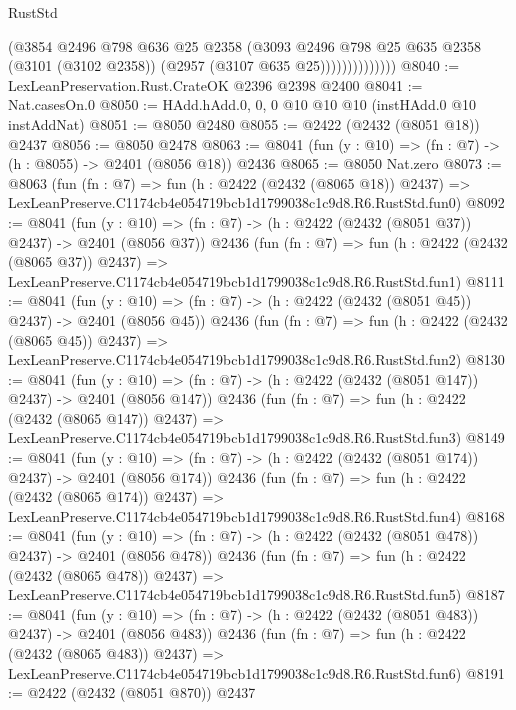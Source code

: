 \begin{lexlean}{RustStd}
\begin{coremodule}
                        (@3854
                          @2496
                          @798
                          @636
                          @25
                          @2358
                          (@3093
                            @2496
                            @798
                            @25
                            @635
                            @2358
                            (@3101 (@3102 @2358))
                            (@2957 (@3107 @635 @25))))))))))))))
@8040 := LexLeanPreservation.Rust.CrateOK @2396 @2398 @2400
@8041 := Nat.casesOn.{0}
@8050 := HAdd.hAdd.{0, 0, 0} @10 @10 @10 (instHAdd.{0} @10 instAddNat)
@8051 := @8050 @2480
@8055 := @2422 (@2432 (@8051 @18)) @2437
@8056 := @8050 @2478
@8063 := @8041 (fun (y : @10) => (fn : @7) -> (h : @8055) -> @2401 (@8056 @18)) @2436
@8065 := @8050 Nat.zero
@8073 := @8063
    (fun (fn : @7) =>
    fun (h : @2422 (@2432 (@8065 @18)) @2437) =>
    LexLeanPreserve.C1174cb4e054719bcb1d1799038c1c9d8.R6.RustStd.fun0)
@8092 := @8041
    (fun (y : @10) => (fn : @7) -> (h : @2422 (@2432 (@8051 @37)) @2437) -> @2401 (@8056 @37))
    @2436
    (fun (fn : @7) =>
    fun (h : @2422 (@2432 (@8065 @37)) @2437) =>
    LexLeanPreserve.C1174cb4e054719bcb1d1799038c1c9d8.R6.RustStd.fun1)
@8111 := @8041
    (fun (y : @10) => (fn : @7) -> (h : @2422 (@2432 (@8051 @45)) @2437) -> @2401 (@8056 @45))
    @2436
    (fun (fn : @7) =>
    fun (h : @2422 (@2432 (@8065 @45)) @2437) =>
    LexLeanPreserve.C1174cb4e054719bcb1d1799038c1c9d8.R6.RustStd.fun2)
@8130 := @8041
    (fun (y : @10) => (fn : @7) -> (h : @2422 (@2432 (@8051 @147)) @2437) -> @2401 (@8056 @147))
    @2436
    (fun (fn : @7) =>
    fun (h : @2422 (@2432 (@8065 @147)) @2437) =>
    LexLeanPreserve.C1174cb4e054719bcb1d1799038c1c9d8.R6.RustStd.fun3)
@8149 := @8041
    (fun (y : @10) => (fn : @7) -> (h : @2422 (@2432 (@8051 @174)) @2437) -> @2401 (@8056 @174))
    @2436
    (fun (fn : @7) =>
    fun (h : @2422 (@2432 (@8065 @174)) @2437) =>
    LexLeanPreserve.C1174cb4e054719bcb1d1799038c1c9d8.R6.RustStd.fun4)
@8168 := @8041
    (fun (y : @10) => (fn : @7) -> (h : @2422 (@2432 (@8051 @478)) @2437) -> @2401 (@8056 @478))
    @2436
    (fun (fn : @7) =>
    fun (h : @2422 (@2432 (@8065 @478)) @2437) =>
    LexLeanPreserve.C1174cb4e054719bcb1d1799038c1c9d8.R6.RustStd.fun5)
@8187 := @8041
    (fun (y : @10) => (fn : @7) -> (h : @2422 (@2432 (@8051 @483)) @2437) -> @2401 (@8056 @483))
    @2436
    (fun (fn : @7) =>
    fun (h : @2422 (@2432 (@8065 @483)) @2437) =>
    LexLeanPreserve.C1174cb4e054719bcb1d1799038c1c9d8.R6.RustStd.fun6)
@8191 := @2422 (@2432 (@8051 @870)) @2437

\end{coremodule}
\end{lexlean}
